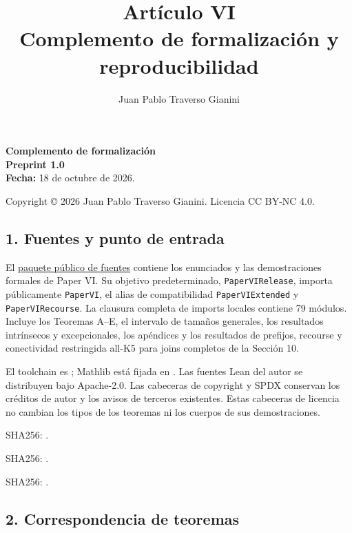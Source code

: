 \documentclass[spanish,11pt,a4paper]{article}
\title{Artículo VI\\Complemento de formalización y reproducibilidad}
\author{Juan Pablo Traverso Gianini}
\date{}
\begin{document}
\raggedbottom\maketitle
\textbf{Complemento de formalización}\\
\textbf{Preprint 1.0}\\
\textbf{Fecha:} 18 de octubre de 2026.

Copyright © 2026 Juan Pablo Traverso Gianini. Licencia CC BY-NC 4.0.

\subsection{1. Fuentes y punto de
entrada}\label{fuentes-y-punto-de-entrada}

El
\href{https://github.com/jtraverso/erdos-81-chordal-clique-partitions/tree/main/preprints/PAPER_VI/05_formalization}{paquete
público de fuentes} contiene los enunciados y las demostraciones
formales de Paper VI. Su objetivo predeterminado,
\texttt{PaperVIRelease}, importa públicamente \texttt{PaperVI}, el alias
de compatibilidad \texttt{PaperVIExtended} y \texttt{PaperVIRecourse}.
La clausura completa de imports locales contiene 79 módulos. Incluye los
Teoremas A--E, el intervalo de tamaños generales, los resultados
intrínsecos y excepcionales, los apéndices y los resultados de prefijos,
recourse y conectividad restringida all-K5 para joins completos de la
Sección 10.

El toolchain es ; Mathlib está fijada
en . Las fuentes Lean
del autor se distribuyen bajo Apache-2.0. Las cabeceras de copyright y
SPDX conservan los créditos de autor y los avisos de terceros
existentes. Estas cabeceras de licencia no cambian los tipos de los
teoremas ni los cuerpos de sus demostraciones.

 SHA256:
.

 SHA256:
.

SHA256:
.

\subsection{2. Correspondencia de
teoremas}\label{correspondencia-de-teoremas}
\end{document}
